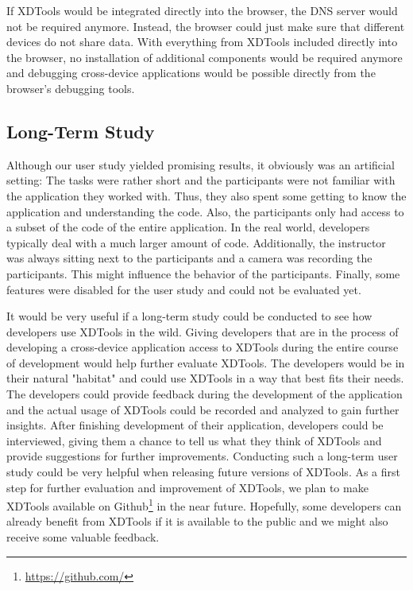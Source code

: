 If XDTools would be integrated directly into the browser, the DNS server would not be required anymore. Instead, the browser could just make sure that different devices do not share data. With everything from XDTools included directly into the browser, no installation of additional components would be required anymore and debugging cross-device applications would be possible directly from the browser's debugging tools.

\subsection{Long-Term Study}

Although our user study yielded promising results, it obviously was an artificial setting: The tasks were rather short and the participants were not familiar with the application they worked with. Thus, they also spent some getting to know the application and understanding the code. Also, the participants only had access to a subset of the code of the entire application. In the real world, developers typically deal with a much larger amount of code. Additionally, the instructor was always sitting next to the participants and a camera was recording the participants. This might influence the behavior of the participants. Finally, some features were disabled for the user study and could not be evaluated yet.

It would be very useful if a long-term study could be conducted to see how developers use XDTools in the wild. Giving developers that are in the process of developing a cross-device application access to XDTools during the entire course of development would help further evaluate XDTools. The developers would be in their natural "habitat" and could use XDTools in a way that best fits their needs. The developers could provide feedback during the development of the application and the actual usage of XDTools could be recorded and analyzed to gain further insights. After finishing development of their application, developers could be interviewed, giving them a chance to tell us what they think of XDTools and provide suggestions for further improvements. Conducting such a long-term user study could be very helpful when releasing future versions of XDTools. As a first step for further evaluation and improvement of XDTools, we plan to make XDTools available on Github\footnote{\url{https://github.com/}} in the near future. Hopefully, some developers can already benefit from XDTools if it is available to the public and we might also receive some valuable feedback.